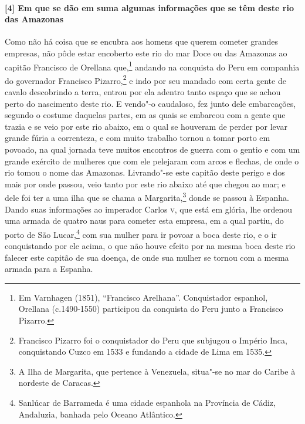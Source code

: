 \paragraph{[4] Em que se dão em suma algumas informações que se têm deste rio das Amazonas} \quad
Como não há coisa que se encubra aos homens que querem cometer grandes empresas, não pôde
estar encoberto este rio do mar Doce ou das Amazonas ao capitão Francisco de Orellana
que,\footnote{ Em Varnhagen (1851), ``Francisco Arelhana''. Conquistador espanhol,
Orellana (c.1490-1550) participou da conquista do Peru junto a Francisco Pizarro.} andando
na conquista do Peru em companhia do governador Francisco Pizarro,\footnote{ Francisco
Pizarro foi o conquistador do Peru que subjugou o Império Inca, conquistando Cuzco em 1533
e fundando a cidade de Lima em 1535.} e indo por seu mandado com certa gente de cavalo
descobrindo a terra, entrou por ela adentro tanto espaço que se achou perto do nascimento
deste rio. E vendo"-o caudaloso, fez junto dele embarcações, segundo o costume daquelas
partes, em as quais se embarcou com a gente que trazia e se veio por este rio abaixo, em o
qual se houveram de perder por levar grande fúria a correnteza, e com muito trabalho
tornou a tomar porto em povoado, na qual jornada teve muitos encontros de guerra com o
gentio e com um grande exército de mulheres que com ele pelejaram com arcos e flechas, de
onde o rio tomou o nome das Amazonas. Livrando"-se este capitão deste perigo e dos mais por
onde passou, veio tanto por este rio abaixo até que chegou ao mar; e dele foi ter a uma
ilha que se chama a Margarita,\footnote{ A Ilha de Margarita, que pertence à Venezuela,
situa"-se no mar do Caribe à nordeste de Caracas.} donde se passou à Espanha. Dando suas
informações ao imperador Carlos \textsc{v}, que está em glória, lhe ordenou uma armada de
quatro naus para cometer esta empresa, em a qual partiu, do porto de São Lucar,\footnote{
Sanlúcar de Barrameda é uma cidade espanhola na Província de Cádiz, Andaluzia, banhada
pelo Oceano Atlântico.} com sua mulher para ir povoar a boca deste rio, e o ir
conquistando por ele acima, o que não houve efeito por na mesma boca deste rio falecer
este capitão de sua doença, de onde sua mulher se tornou com a mesma armada para a
Espanha.

